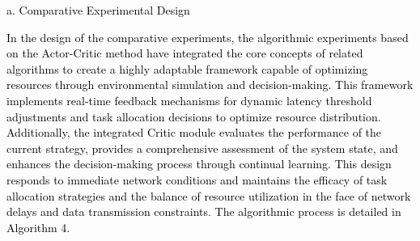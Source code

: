 \documentclass[preprint,12pt]{elsarticle}
\begin{document}
\textcolor{black}{a.	Comparative Experimental Design}

\textcolor{black}{In the design of the comparative experiments, the algorithmic experiments based on the Actor-Critic method have integrated the core concepts of related algorithms to create a highly adaptable framework capable of optimizing resources through environmental simulation and decision-making. This framework implements real-time feedback mechanisms for dynamic latency threshold adjustments and task allocation decisions to optimize resource distribution\cite{chen2023adaptive}\cite{chen2024optimal}. Additionally, the integrated Critic module evaluates the performance of the current strategy, provides a comprehensive assessment of the system state, and enhances the decision-making process through continual learning\cite{zhang2023optimal}. This design responds to immediate network conditions and maintains the efficacy of task allocation strategies and the balance of resource utilization in the face of network delays and data transmission constraints. The algorithmic process is detailed in Algorithm 4.}
\end{document}
